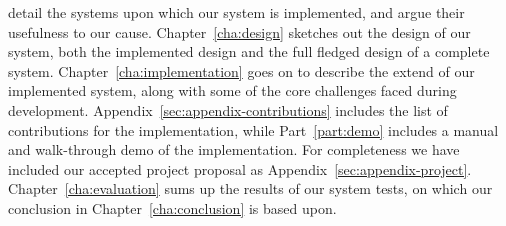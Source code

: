 detail the systems upon which our system is implemented, and argue their
usefulness to our cause.
Chapter~\ref{cha:design} sketches out the design of our system, both 
the implemented design and the full fledged design of a complete system.
Chapter~\ref{cha:implementation} goes on to describe the extend of our
implemented system, along with some of the core challenges faced during development.
Appendix~\ref{sec:appendix-contributions} includes the list of contributions
for the implementation,
while Part~\ref{part:demo} includes a manual and walk-through demo of the implementation.
For completeness we have included our accepted project proposal as
Appendix~\ref{sec:appendix-project}.
Chapter~\ref{cha:evaluation} sums up the results of our system tests,
on which our conclusion in Chapter~\ref{cha:conclusion} is based upon.

